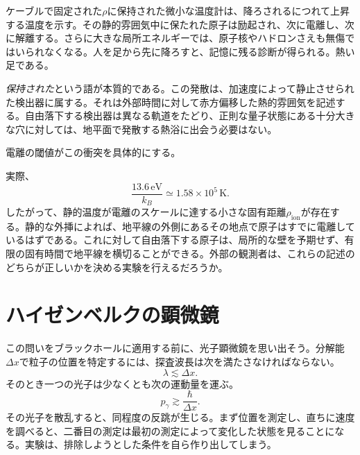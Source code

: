 ケーブルで固定された\(\rho\)に保持された微小な温度計は、降ろされるにつれて上昇する温度を示す。その静的雰囲気中に保たれた原子は励起され、次に電離し、次に解離する。さらに大きな局所エネルギーでは、原子核やハドロンさえも無傷ではいられなくなる。人を足から先に降ろすと、記憶に残る診断が得られる。熱い足である。

\emph{保持された}という語が本質的である。この発散は、加速度によって静止させられた検出器に属する。それは外部時間に対して赤方偏移した熱的雰囲気を記述する。自由落下する検出器は異なる軌道をたどり、正則な量子状態にある十分大きな穴に対しては、地平面で発散する熱浴に出会う必要はない。

電離の閾値がこの衝突を具体的にする。

\begin{classroomqa}
\end{classroomqa}

実際、
\begin{equation}
\frac{13.6\,\mathrm{eV}}{k_B}\simeq1.58\times10^5\,\mathrm{K}.
\end{equation}
したがって、静的温度が電離のスケールに達する小さな固有距離\(\rho_{\mathrm{ion}}\)が存在する。静的な外挿によれば、地平線の外側にあるその地点で原子はすでに電離しているはずである。これに対して自由落下する原子は、局所的な壁を予期せず、有限の固有時間で地平線を横切ることができる。外部の観測者は、これらの記述のどちらが正しいかを決める実験を行えるだろうか。

\section{ハイゼンベルクの顕微鏡}

この問いをブラックホールに適用する前に、光子顕微鏡を思い出そう。分解能\(\Delta x\)で粒子の位置を特定するには、探査波長は次を満たさなければならない。
\begin{equation}
\lambda\lesssim\Delta x.
\end{equation}
そのとき一つの光子は少なくとも次の運動量を運ぶ。
\begin{equation}
p_\gamma\gtrsim\frac{\hbar}{\Delta x}.
\label{eq:l05-microscope}
\end{equation}
その光子を散乱すると、同程度の反跳が生じる。まず位置を測定し、直ちに速度を調べると、二番目の測定は最初の測定によって変化した状態を見ることになる。実験は、排除しようとした条件を自ら作り出してしまう。

